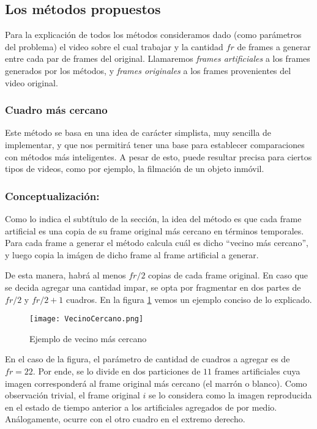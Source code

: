 \subsection{Los m\'etodos propuestos}

Para la explicación de todos los métodos consideramos dado (como parámetros del problema) el video sobre el cual trabajar y la cantidad $fr$ de frames a generar entre cada par de frames del original. Llamaremos \emph{frames artificiales} a los frames generados por los métodos, y \emph{frames originales} a los frames provenientes del video original.

\subsubsection{Cuadro m\'as cercano}

Este m\'etodo se basa en una idea de car\'acter simplista, muy sencilla de implementar, y que nos permitirá tener una base para establecer comparaciones con métodos más inteligentes. A pesar de esto, puede resultar precisa para ciertos tipos de videos, como por ejemplo, la filmaci\'on de un objeto inmóvil.

\subsubsection*{\bf{Conceptualizaci\'on:}}

Como lo indica el subt\'itulo de la secci\'on, la idea del método es que cada frame artificial es una copia de su frame original más cercano en términos temporales. Para cada frame a generar el método calcula cuál es dicho ``vecino más cercano'', y luego copia la im\'agen de dicho frame al frame artificial a generar. 

De esta manera, habr\'a al menos $fr/2$ copias de cada frame original. En caso que se decida agregar una cantidad impar, se opta por fragmentar en dos partes de $fr/2$ y $fr/2+1$ cuadros. En la figura \ref{fig:vecino} vemos un ejemplo conciso de lo explicado.

\begin{figure}[h!]
  \centering
    \texttt{[image: VecinoCercano.png]}
     \caption{Ejemplo de vecino m\'as cercano}\label{fig:vecino}
\end{figure}
\noindent

En el caso de la figura, el par\'ametro de cantidad de cuadros a agregar es de $fr = 22$. Por ende, se lo divide en dos particiones de $11$ frames artificiales cuya imagen corresponder\'a al frame original m\'as cercano (el marr\'on o blanco). Como observaci\'on trivial, el frame original $i$ se lo considera como la imagen reproducida en el estado de tiempo anterior a los artificiales agregados de por medio. An\'alogamente, ocurre con el otro cuadro en el extremo derecho.

